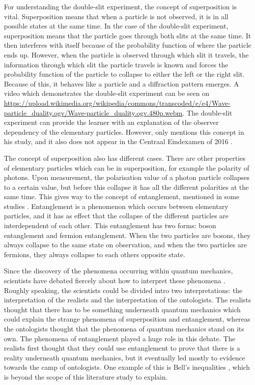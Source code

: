 \documentclass[11pt,twoside]{report} %
\begin{document}
For understanding the double-slit experiment, the concept of superposition is vital. Superposition means that when a particle is not observed, it is in all possible states at the same time. In the case of the double-slit experiment, superposition means that the particle goes through both slits at the same time. It then interferes with itself because of the probability function of where the particle ends up. However, when the particle is observed through which slit it travels, the information through which slit the particle travels is known and forces the probability function of the particle to collapse to either the left or the right slit. Because of this, it behaves like a particle and a diffraction pattern emerges. A video which demonstrates the double-slit experiment can be seen on \url{https://upload.wikimedia.org/wikipedia/commons/transcoded/e/e4/Wave-particle_duality.ogv/Wave-particle_duality.ogv.480p.webm}. The double-slit experiment can provide the learner with an explanation of the observer dependency of the elementary particles. However, only  mentions this concept in his study, and it also does not appear in the Centraal Eindexamen of 2016 \cite{eindexamen2016}.

The concept of superposition also has different cases. There are other properties of elementary particles which can be in superposition, for example the polarity of photons. Upon measurement, the polarisation value of a photon particle collapses to a certain value, but before this collapse it has all the different polarities at the same time. This gives way to the concept of entanglement, mentioned in some studies \cite{henriksen, hobson, kuttner}. Entanglement is a phenomenon which occurs between elementary particles, and it has as effect that the collapse of the different particles are interdependent of each other. This entanglement has two forms: boson entanglement and fermion entanglement. When the two particles are bosons, they always collapse to the same state on observation, and when the two particles are fermions, they always collapse to each others opposite state.

Since the discovery of the phenomena occurring within quantum mechanics, scientists have debated fiercely about how to interpret these phenomena \cite{barnes}. Roughly speaking, the scientists could be divided intro two interpretations: the interpretation of the realists and the interpretation of the ontologists. The realists thought that there has to be something underneath quantum mechanics which could explain the strange phenomena of superposition and entanglement, whereas the ontologists thought that the phenomena of quantum mechanics stand on its own. The phenomena of entanglement played a huge role in this debate. The realists first thought that they could use entanglement to prove that there is a reality underneath quantum mechanics, but it eventually led mostly to evidence towards the camp of ontologists. One example of this is Bell's inequalities \cite{kuttner, muller}, which is beyond the scope of this literature study to explain.
\end{document}
